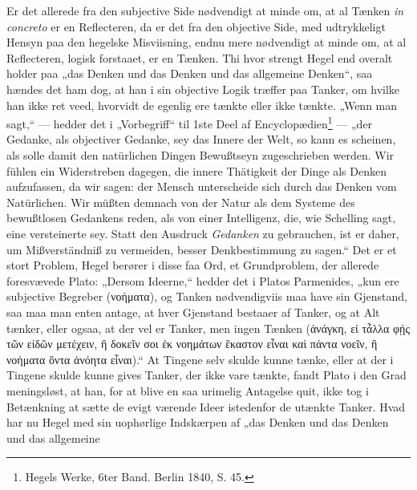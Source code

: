 \documentclass[11pt]{book}
\newcommand{\opage}[1]{\marginnote{\footnotesize\textit{[#1]}}}
\begin{document}
Er det allerede fra den subjective Side nødvendigt at minde om, at al
Tænken \textit{in concreto} er en Reflecteren, da er det fra den objective
Side, med udtrykkeligt Hensyn paa den hegelske Misviisning, endnu mere
nødvendigt at minde om, at al Reflecteren, logisk forstaaet, er en Tænken.
Thi hvor strengt Hegel end overalt holder paa „das Denken und das Denken
und das allgemeine Denken“, saa hændes det ham dog, at han i sin objective
Logik træffer paa Tanker, om hvilke han ikke ret veed, hvorvidt de egenlig
ere tænkte eller ikke tænkte. „Wenn man sagt,“ --- hedder det i
„Vorbegriff“ til 1ste Deel af Encyclopædien\footnote{Hegels Werke, 6ter
Band. Berlin 1840, S. 45.} --- „der Gedanke, als objectiver Gedanke, sey
das Innere der Welt, so kann es scheinen, als solle damit den natürlichen
Dingen Bewußtseyn zugeschrieben werden. Wir fühlen ein Widerstreben
dagegen, die innere Thätigkeit der Dinge als Denken aufzufassen, da wir
sagen:
\opage{58} \setcounter{footnote}{0}%
der Mensch unterscheide sich durch das Denken vom Natürlichen. Wir müßten
demnach von der Natur als dem Systeme des bewußtlosen Gedankens reden, als
von einer Intelligenz, die, wie Schelling sagt, eine versteinerte sey.
Statt den Ausdruck \emph{Gedanken} zu gebrauchen, ist er daher, um
Mißverständniß zu vermeiden, besser Denkbestimmung zu sagen.“ Det er et
stort Problem, Hegel berører i disse faa Ord, et Grundproblem, der allerede
foresvævede Plato: „Dersom Ideerne,“ hedder det i Platos Parmenides, „kun
ere subjective Begreber (νοήματα), og Tanken nødvendigviis maa have sin
Gjenstand, saa maa man enten antage, at hver Gjenstand bestaaer af Tanker,
og at Alt tænker, eller ogsaa, at der vel er Tanker, men ingen Tænken
(ἀνάγκη, εἰ τἆλλα φῄς τῶν εἰδῶν μετέχειν, ἢ δοκεῖν σοι ἐκ νοημάτων ἕκαστον
εἶναι καὶ πάντα νοεῖν, ἢ νοήματα ὄντα ἀνόητα εἶναι).“ At Tingene selv
skulde kunne tænke, eller at der i Tingene skulde kunne gives Tanker, der
ikke vare tænkte, fandt Plato i den Grad meningsløst, at han, for at blive
en saa urimelig Antagelse quit, ikke tog i Betænkning at sætte de evigt
værende Ideer istedenfor de utænkte Tanker. Hvad har nu Hegel med sin
uophørlige Indskærpen af „das Denken und das Denken und das allgemeine
\end{document}
